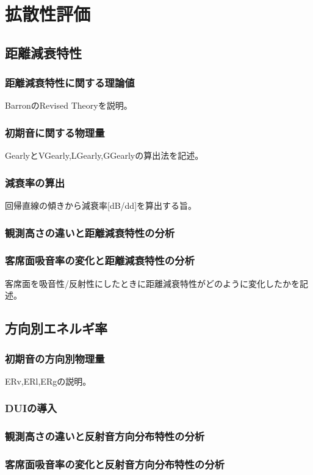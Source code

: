\chapter{拡散性評価}
\section{距離減衰特性}
\subsection{距離減衰特性に関する理論値}
BarronのRevised Theoryを説明。
\subsection{初期音に関する物理量}
GearlyとVGearly,LGearly,GGearlyの算出法を記述。
\subsection{減衰率の算出}
回帰直線の傾きから減衰率[dB/dd]を算出する旨。
\subsection{観測高さの違いと距離減衰特性の分析}
\subsection{客席面吸音率の変化と距離減衰特性の分析}
客席面を吸音性/反射性にしたときに距離減衰特性がどのように変化したかを記述。
\section{方向別エネルギ率}
\subsection{初期音の方向別物理量}
ERv,ERl,ERgの説明。
\subsection{DUIの導入}
\subsection{観測高さの違いと反射音方向分布特性の分析}
\subsection{客席面吸音率の変化と反射音方向分布特性の分析}
